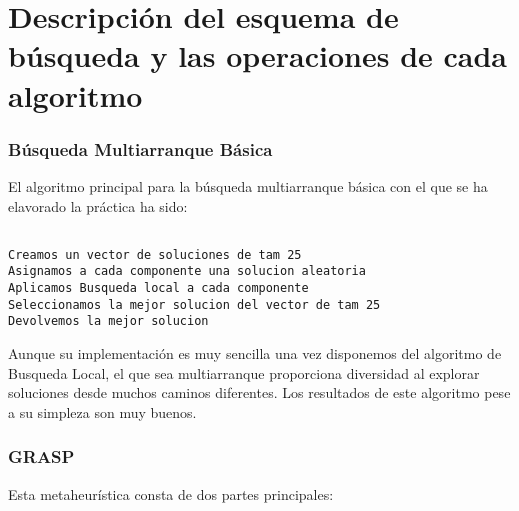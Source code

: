 \section{Descripción del esquema de búsqueda y las operaciones de cada algoritmo}	
		
		\subsubsection{Búsqueda Multiarranque Básica}
		
		El algoritmo principal para la búsqueda multiarranque básica con el que se ha elavorado la práctica ha sido:
		
	\begin{lstlisting}[language=SH]
					
Creamos un vector de soluciones de tam 25
Asignamos a cada componente una solucion aleatoria
Aplicamos Busqueda local a cada componente
Seleccionamos la mejor solucion del vector de tam 25
Devolvemos la mejor solucion

	\end{lstlisting}
	
	Aunque su implementación es muy sencilla una vez disponemos del algoritmo de Busqueda Local, el que sea multiarranque proporciona diversidad al explorar soluciones desde muchos caminos diferentes. Los resultados de este algoritmo pese a su simpleza son muy buenos.
		\newpage
		\subsubsection{GRASP}
		Esta metaheurística consta de dos partes principales:
		
